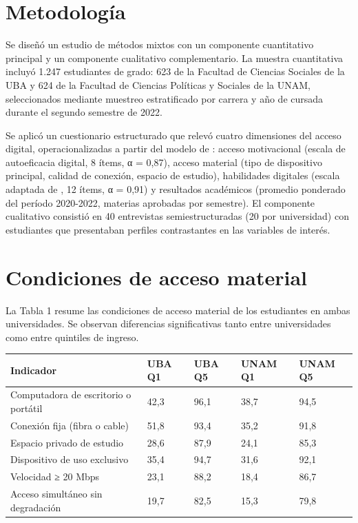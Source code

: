 \section{Metodología}
Se diseñó un estudio de métodos mixtos con un componente cuantitativo principal y un componente cualitativo complementario. La muestra cuantitativa incluyó 1.247 estudiantes de grado: 623 de la Facultad de Ciencias Sociales de la UBA y 624 de la Facultad de Ciencias Políticas y Sociales de la UNAM, seleccionados mediante muestreo estratificado por carrera y año de cursada durante el segundo semestre de 2022.

Se aplicó un cuestionario estructurado que relevó cuatro dimensiones del acceso digital, operacionalizadas a partir del modelo de \textcite{2563-VANDIJK2020}: acceso motivacional (escala de autoeficacia digital, 8 ítems, α = 0,87), acceso material (tipo de dispositivo principal, calidad de conexión, espacio de estudio), habilidades digitales (escala adaptada de \textcite{2666-VANDEURSEN2019}, 12 ítems, α = 0,91) y resultados académicos (promedio ponderado del período 2020-2022, materias aprobadas por semestre). El componente cualitativo consistió en 40 entrevistas semiestructuradas (20 por universidad) con estudiantes que presentaban perfiles contrastantes en las variables de interés.


\section{Condiciones de acceso material}
La Tabla 1 resume las condiciones de acceso material de los estudiantes en ambas universidades. Se observan diferencias significativas tanto entre universidades como entre quintiles de ingreso.


\begin{table}[!ht]
\centering
{\sf\footnotesize\setlength\tabcolsep{4pt}%
  \begin{tabular}{@{}lllll@{}}
    \toprule
    \textbf{\textbf{Indicador}} & \textbf{\textbf{UBA Q1}} & \textbf{\textbf{UBA Q5}} & \textbf{\textbf{UNAM Q1}} & \textbf{\textbf{UNAM Q5}} \\
    \midrule
    Computadora de escritorio o portátil & 42,3 & 96,1 & 38,7 & 94,5 \\
    \midrule
    Conexión fija (fibra o cable) & 51,8 & 93,4 & 35,2 & 91,8 \\
    \midrule
    Espacio privado de estudio & 28,6 & 87,9 & 24,1 & 85,3 \\
    \midrule
    Dispositivo de uso exclusivo & 35,4 & 94,7 & 31,6 & 92,1 \\
    \midrule
    Velocidad ≥ 20 Mbps & 23,1 & 88,2 & 18,4 & 86,7 \\
    \midrule
    Acceso simultáneo sin degradación & 19,7 & 82,5 & 15,3 & 79,8 \\
    \bottomrule
  \end{tabular}
}%
\label{tbl-1}
\end{table}


